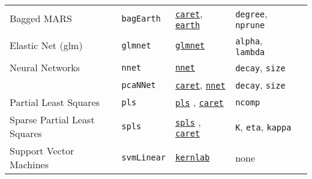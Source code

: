\documentclass[12pt]{article}
\begin{document}
\begin{landscape}
\begin{longtable}{lllll}
\rowcolor[rgb]{.95, .95, .95}                     
      Bagged MARS &
         \texttt{bagEarth} & 
            {\tt \href{http://cran.r-project.org/web/packages/caret/index.html}{caret}},   {\tt \href{http://cran.r-project.org/web/packages/earth/index.html}{earth}}      & 
            \texttt{degree}, \texttt{nprune} \\ 
            
      Elastic Net (glm) &               
         \texttt{glmnet} & 
             {\tt \href{http://cran.r-project.org/web/packages/glmnet/index.html}{glmnet}}       &       
            \texttt{alpha}, \texttt{lambda} \\ 
            
\rowcolor[rgb]{.95, .95, .95}                     
      Neural Networks &               
         \texttt{nnet} & 
             {\tt \href{http://cran.r-project.org/web/packages/nnet/index.html}{nnet}}       &       
            \texttt{decay}, \texttt{size} \\      

\rowcolor[rgb]{.95, .95, .95}         
       &               
         \texttt{pcaNNet} & 
            {\tt \href{http://cran.r-project.org/web/packages/caret/index.html}{caret}},
            {\tt \href{http://cran.r-project.org/web/packages/nnet/index.html}{nnet}}&       
            \texttt{decay}, \texttt{size} \\              
            
      Partial Least Squares &
         \texttt{pls} & 
             {\tt \href{http://cran.r-project.org/web/packages/pls/index.html}{pls}} ,  {\tt \href{http://cran.r-project.org/web/packages/caret/index.html}{caret}}       & 
            \texttt{ncomp} \\      

\rowcolor[rgb]{.95, .95, .95}         

      Sparse Partial Least Squares&
         \texttt{spls} & 
             {\tt \href{http://cran.r-project.org/web/packages/spls/index.html}{spls}} , 
             {\tt \href{http://cran.r-project.org/web/packages/caret/index.html}{caret}}      & 
            \texttt{K}, \texttt{eta}, \texttt{kappa} \\   
      
      Support Vector Machines  &
         \texttt{svmLinear} & 
             {\tt \href{http://cran.r-project.org/web/packages/kernlab/index.html}{kernlab}}       & 
            none \\              
      

\end{longtable}
\end{landscape}
\end{document}
